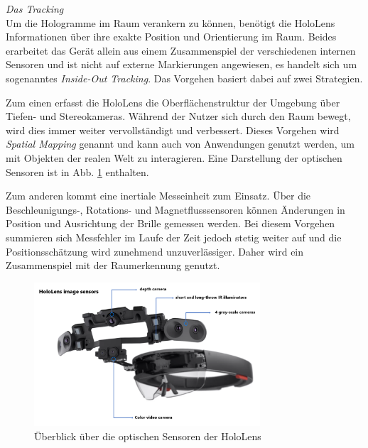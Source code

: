 \vspace{4px}
\textit{Das Tracking}\\
Um die Hologramme im Raum verankern zu können, benötigt die HoloLens Informationen über ihre exakte Position und Orientierung im Raum. Beides erarbeitet das Gerät allein aus einem Zusammenspiel der verschiedenen internen Sensoren und ist nicht auf externe Markierungen angewiesen, es handelt sich um sogenanntes \textit{Inside-Out Tracking}. Das Vorgehen basiert dabei auf zwei Strategien.
\par
\noindent\hspace*{5mm}
Zum einen erfasst die HoloLens die Oberflächenstruktur der Umgebung über Tiefen- und Stereokameras. Während der Nutzer sich durch den Raum bewegt, wird dies immer weiter vervollständigt und verbessert. Dieses Vorgehen wird \textit{Spatial Mapping} genannt und kann auch von Anwendungen genutzt werden, um mit Objekten der realen Welt zu interagieren. Eine Darstellung der optischen Sensoren ist in Abb. \ref{img:hololens_tech} enthalten.
\par
\noindent\hspace*{5mm}
Zum anderen kommt eine inertiale Messeinheit zum Einsatz. Über die Beschleunigungs-, Rotations- und Magnetflusssensoren können Änderungen in Position und Ausrichtung der Brille gemessen werden. Bei diesem Vorgehen summieren sich Messfehler im Laufe der Zeit jedoch stetig weiter auf und die Positionsschätzung wird zunehmend unzuverlässiger. Daher wird ein Zusammenspiel mit der Raumerkennung genutzt.
\begin{figure}[h!]
	\centering
	\includegraphics[width=0.75\textwidth]{images/papers/hololens_tech.png}
	\caption{Überblick über die optischen Sensoren der HoloLens \cite{MRDoc}}
	\label{img:hololens_tech}
\end{figure}

